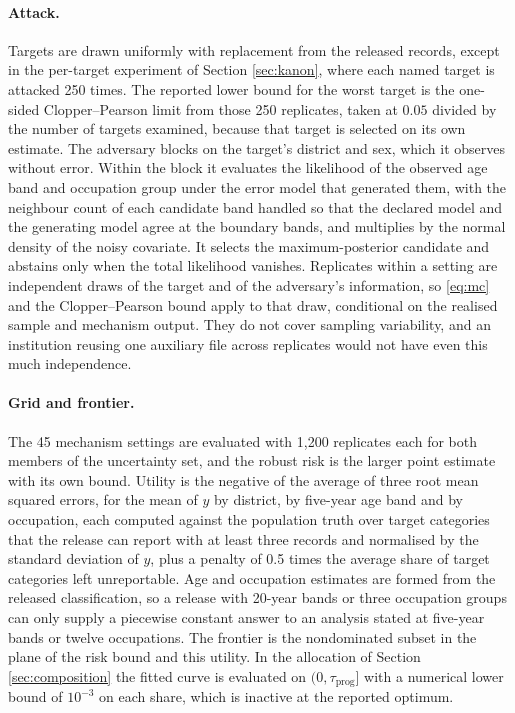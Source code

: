 \documentclass[11pt,a4paper]{article}
\theoremstyle{plain}
\theoremstyle{definition}
\theoremstyle{definition}
\theoremstyle{plain}
\begin{document}
\paragraph{Attack.} Targets are drawn uniformly with replacement from the
released records, except in the per-target experiment of Section
\ref{sec:kanon}, where each named target is attacked 250 times. The reported
lower bound for the worst target is the one-sided Clopper--Pearson limit from
those 250 replicates, taken at $0.05$ divided by the number of targets examined,
because that target is selected on its own estimate.
The adversary blocks on the target's district and sex, which it observes without
error. Within the block it evaluates the likelihood of the observed age band and
occupation group under the error model that generated them, with the neighbour
count of each candidate band handled so that the declared model and the
generating model agree at the boundary bands, and multiplies by the normal
density of the noisy covariate. It selects the maximum-posterior candidate and
abstains only when the total likelihood vanishes. Replicates within a setting
are independent draws of the target and of the adversary's information, so
\eqref{eq:mc} and the Clopper--Pearson bound apply to that draw, conditional on
the realised sample and mechanism output. They do not cover sampling
variability, and an institution reusing one auxiliary file across replicates
would not have even this much independence.

\paragraph{Grid and frontier.} The 45 mechanism settings are evaluated with
1,200 replicates each for both members of the uncertainty set, and the robust
risk is the larger point estimate with its own bound. Utility is the negative of
the average of three root mean squared errors, for the mean of $y$ by district,
by five-year age band and by occupation, each computed against the population
truth over target categories that the release can report with at least three
records and normalised by the standard deviation of $y$, plus a penalty of 0.5
times the average share of target categories left unreportable. Age and
occupation estimates are formed from the released classification, so a release
with 20-year bands or three occupation groups can only supply a piecewise
constant answer to an analysis stated at five-year bands or twelve occupations.
The frontier is the nondominated subset in the plane of the risk bound and this
utility. In the allocation of Section \ref{sec:composition} the fitted curve is
evaluated on $(0, \tau_{\mathrm{prog}}]$ with a numerical lower bound of
$10^{-3}$ on each share, which is inactive at the reported optimum.
\end{document}
